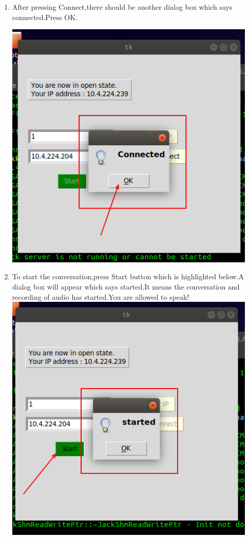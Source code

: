 \documentclass[12pt]{article}
\begin{document}
\begin{enumerate}
    \item After pressing Connect,there should be another dialog box which says connected.Press OK.
    
    \bigbreak
     \includegraphics[width=120mm,scale=0.8]{6.png}
     
    \item To start the conversation,press Start button which is highlighted below.A dialog box will appear which says started.It means the conversation and recording of audio has started.You are allowed to speak!
    \bigbreak
     \includegraphics[width=120mm,scale=0.8]{7.png}
     

\end{enumerate}
\end{document}
